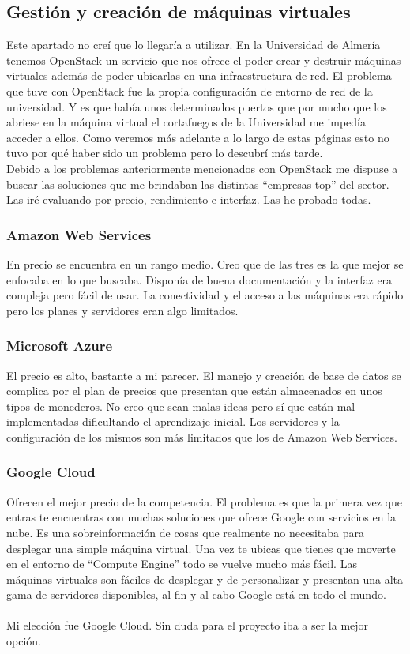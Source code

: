 \subsection{Gestión y creación de máquinas virtuales}

Este apartado no creí que lo llegaría a utilizar. En la Universidad de Almería tenemos OpenStack un servicio que nos ofrece el poder crear y destruir máquinas virtuales además de poder ubicarlas en una infraestructura de red. El problema que tuve con OpenStack fue la propia configuración de entorno de red de la universidad. Y es que había unos determinados puertos que por mucho que los abriese en la máquina virtual el cortafuegos de la Universidad me impedía acceder a ellos. Como veremos más adelante a lo largo de estas páginas esto no tuvo por qué haber sido un problema pero lo descubrí más tarde.
\\Debido a los problemas anteriormente mencionados con OpenStack me dispuse a buscar las soluciones que me brindaban las distintas ``empresas top'' del sector.
\\Las iré evaluando por precio, rendimiento e interfaz. Las he probado todas.

\subsubsection{Amazon Web Services}
En precio se encuentra en un rango medio. Creo que de las tres es la que mejor se enfocaba en lo que buscaba. Disponía de buena documentación y la interfaz era compleja pero fácil de usar. La conectividad y el acceso a las máquinas era rápido pero los planes y servidores eran algo limitados.
\subsubsection{Microsoft Azure}
El precio es alto, bastante a mi parecer. El manejo y creación de base de datos se complica por el plan de precios que presentan que están almacenados en unos tipos de monederos. No creo que sean malas ideas pero sí que están mal implementadas dificultando el aprendizaje inicial. Los servidores y la configuración de los mismos son más limitados que los de Amazon Web Services.
\subsubsection{Google Cloud}
Ofrecen el mejor precio de la competencia. El problema es que la primera vez que entras te encuentras con muchas soluciones que ofrece Google con servicios en la nube. Es una sobreinformación de cosas que realmente no necesitaba para desplegar una simple máquina virtual. Una vez te ubicas que tienes que moverte en el entorno de ``Compute Engine'' todo se vuelve mucho más fácil. Las máquinas virtuales son fáciles de desplegar y de personalizar y presentan una alta gama de servidores disponibles, al fin y al cabo Google está en todo el mundo.
\\\\Mi elección fue Google Cloud. Sin duda para el proyecto iba a ser la mejor opción.
